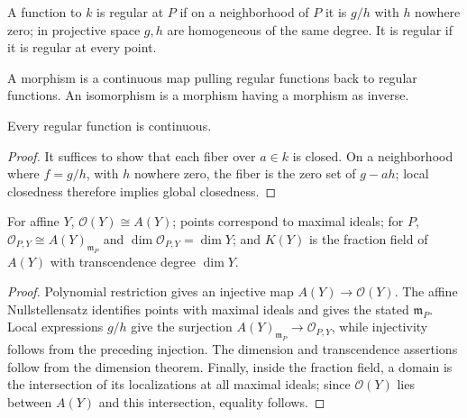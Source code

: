 \begin{definition}
\label{def:ha-ch1-regular-function}
A function to $k$ is regular at $P$ if on a neighborhood of $P$ it is $g/h$ with $h$ nowhere
zero; in projective space $g,h$ are homogeneous of the same degree. It is regular if it is regular
at every point.
\end{definition}

\begin{definition}
\label{def:ha-ch1-morphism}
A morphism is a continuous map pulling regular functions back to regular functions. An isomorphism
is a morphism having a morphism as inverse.
\end{definition}

\begin{lemma}
\label{lem:ha-ch1-3-1}
Every regular function is continuous.
\end{lemma}
\begin{proof}
It suffices to show that each fiber over $a\in k$ is closed.  On a neighborhood where $f=g/h$,
with $h$ nowhere zero, the fiber is the zero set of $g-ah$; local closedness therefore implies
global closedness.
\end{proof}

\begin{theorem}
\label{thm:ha-ch1-3-2}
For affine $Y$, $\mathcal O(Y)\cong A(Y)$; points correspond to maximal ideals; for $P$,
$\mathcal O_{P,Y}\cong A(Y)_{\mathfrak m_P}$ and $\dim\mathcal O_{P,Y}=\dim Y$; and
$K(Y)$ is the fraction field of $A(Y)$ with transcendence degree $\dim Y$.
\end{theorem}
\begin{proof}
Polynomial restriction gives an injective map $A(Y)\to\mathcal O(Y)$.  The affine Nullstellensatz
identifies points with maximal ideals and gives the stated $\mathfrak m_P$.  Local expressions $g/h$
give the surjection $A(Y)_{\mathfrak m_P}\to\mathcal O_{P,Y}$, while injectivity follows from
the preceding injection.  The dimension and transcendence assertions follow from the dimension
theorem.  Finally, inside the fraction field, a domain is the intersection of its localizations at
all maximal ideals; since $\mathcal O(Y)$ lies between $A(Y)$ and this intersection, equality follows.
\end{proof}

